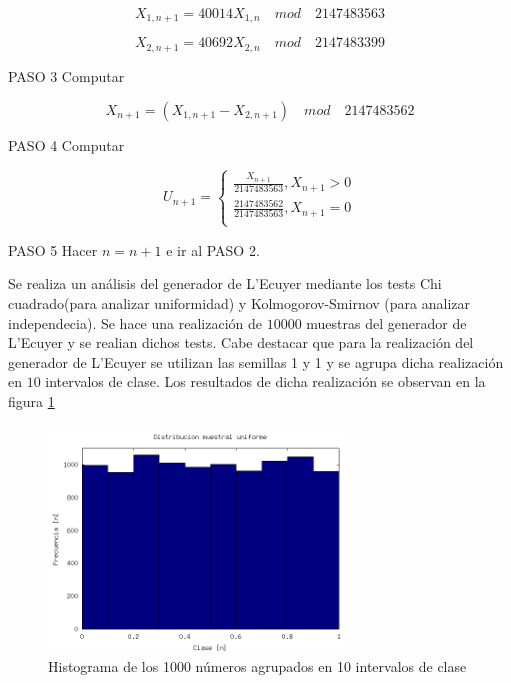 \documentclass{sig-alternate}
\begin{document}
\begin{equation}
	X_{1,n+1} = 40014 X_{1,n} \quad mod \quad 2147483563
\end{equation}

\begin{equation}
	X_{2,n+1} = 40692 X_{2,n} \quad mod \quad 2147483399
\end{equation}


\par PASO 3 Computar

\begin{equation}
	X_{n+1} = (X_{1,n+1} - X_{2,n+1} ) \quad mod \quad 2147483562
\end{equation}

\par PASO 4 Computar

\begin{equation}
	U_{n+1} =
	\begin{cases}
		\frac{X_{n+1}}{2147483563}, X_{n+1} > 0 \\
		\frac{2147483562}{2147483563}, X_{n+1} = 0 \\
	\end{cases}
\end{equation}

\par PASO 5 Hacer $n = n + 1$ e ir al PASO 2.

Se realiza un an\'alisis del generador de L'Ecuyer mediante los tests
Chi cuadrado(para analizar uniformidad) y Kolmogorov-Smirnov
(para analizar independecia).
Se hace una realizaci\'on de $10000$ muestras del generador de L'Ecuyer y se realian dichos tests.
Cabe destacar que para la realizaci\'on del generador de L'Ecuyer se utilizan las semillas 1 y 1 y
se agrupa dicha realizaci\'on en $10$ intervalos de clase. Los resultados de dicha realizaci\'on 
se observan en la figura \ref{fig:histograma_ecuyer}

\begin{figure}[ht]
\label{fig:histograma_ecuyer}
\includegraphics[width=8cm]{histograma_ecuyer}
\caption{Histograma de los 1000 n\'umeros agrupados en 10 intervalos de clase}
\end{figure}
\end{document}
